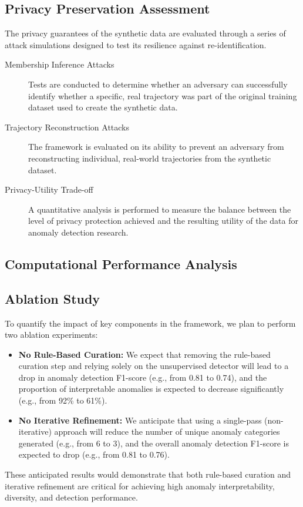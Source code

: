 \documentclass[runningheads]{llncs}
\begin{document}
\subsection{Privacy Preservation Assessment}
\label{sec:privacy-eval}

The privacy guarantees of the synthetic data are evaluated through a series of attack simulations designed to test its resilience against re-identification.

\begin{description}
    \item[Membership Inference Attacks] Tests are conducted to determine whether an adversary can successfully identify whether a specific, real trajectory was part of the original training dataset used to create the synthetic data.
    \item[Trajectory Reconstruction Attacks] The framework is evaluated on its ability to prevent an adversary from reconstructing individual, real-world trajectories from the synthetic dataset.
    \item[Privacy-Utility Trade-off] A quantitative analysis is performed to measure the balance between the level of privacy protection achieved and the resulting utility of the data for anomaly detection research.
\end{description}

\subsection{Computational Performance Analysis}
\label{sec:performance}

\begin{compactoutline}
\end{compactoutline}

\subsection{Ablation Study}
\label{sec:ablation}

To quantify the impact of key components in the framework, we plan to perform two ablation experiments:
\begin{itemize}
    \item \textbf{No Rule-Based Curation:} We expect that removing the rule-based curation step and relying solely on the unsupervised detector will lead to a drop in anomaly detection F1-score (e.g., from 0.81 to 0.74), and the proportion of interpretable anomalies is expected to decrease significantly (e.g., from 92\% to 61\%).
    \item \textbf{No Iterative Refinement:} We anticipate that using a single-pass (non-iterative) approach will reduce the number of unique anomaly categories generated (e.g., from 6 to 3), and the overall anomaly detection F1-score is expected to drop (e.g., from 0.81 to 0.76).
\end{itemize}
These anticipated results would demonstrate that both rule-based curation and iterative refinement are critical for achieving high anomaly interpretability, diversity, and detection performance.
\end{document}
